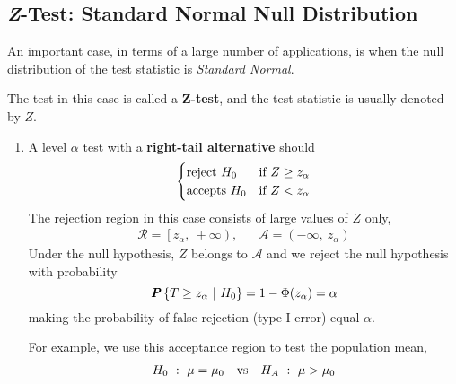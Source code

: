 \subsection{\textit{Z}-Test: Standard Normal Null Distribution}
\label{subsec:z-test}
\setcounter{equation}{13}

An important case, in terms of a large number of applications, is when the null distribution of the test statistic is \textit{Standard Normal}.

The test in this case is called a \textbf{Z-test}, and the test statistic is usually denoted by $Z$.

\begin{enumerate}[label=(\alph*)]
  \item A level $\alpha$ test with a \textbf{right-tail alternative} should
    \begin{equation}
      \begin{cases}
        \textnormal{reject } H_0 &\textnormal{if } Z \geq z_{\alpha}\\
        \textnormal{accepts } H_0 &\textnormal{if } Z < z_{\alpha}\\
      \end{cases}
    \end{equation}
    The rejection region in this case consists of large values of $Z$ only,
    \begin{align*}
      \mathcal{R} = \left[ z_{\alpha},\ +\infty \right), & &\mathcal{A} = \left( -\infty,\ z_{\alpha} \right)
    \end{align*}
    Under the null hypothesis, $Z$ belongs to $\mathcal{A}$ and we reject the null hypothesis with probability
    \begin{equation*}
      \textbf{\textit{P}}\left\{T \geq z_{\alpha}\ |\ H_0\right\} = 1 - \Phi(z_{\alpha}) = \alpha
    \end{equation*}
    making the probability of false rejection (type I error) equal $\alpha$.

    For example, we use this acceptance region to test the population mean,
    \begin{align*}
      H_0\ :\ \mu = \mu_0 &&\textnormal{vs}&& H_A\ :\ \mu > \mu_0
    \end{align*}
  

\end{enumerate}
